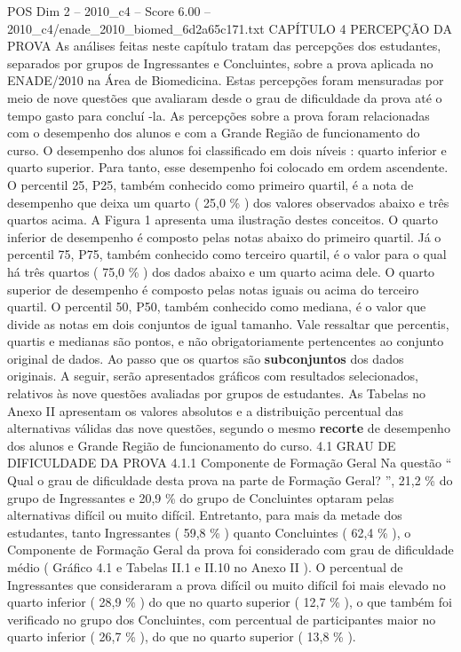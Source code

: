 \begin{textsample}{POS Dim 2 – 2010\_c4 – Score 6.00 – 2010\_c4/enade\_2010\_biomed\_6d2a65c171.txt}  \label{ex:f2_pos_141}
CAPÍTULO 4 PERCEPÇÃO DA PROVA As análises feitas neste capítulo tratam das percepções dos estudantes, separados por grupos de Ingressantes e Concluintes, sobre a prova aplicada no ENADE/2010 na Área de Biomedicina.
Estas percepções foram mensuradas por meio de nove questões que avaliaram desde o grau de dificuldade da prova até o tempo gasto para concluí -la.
As percepções sobre a prova foram relacionadas com o desempenho dos alunos e com a Grande Região de funcionamento do curso.
O desempenho dos alunos foi classificado em dois níveis : quarto inferior e quarto superior.
Para tanto, esse desempenho foi colocado em ordem ascendente.
O percentil 25, P25, também conhecido como primeiro quartil, é a nota de desempenho que deixa um quarto ( 25,0 \% ) dos valores observados abaixo e três quartos acima.
A Figura 1 apresenta uma ilustração destes conceitos.
O quarto inferior de desempenho é composto pelas notas abaixo do primeiro quartil.
Já o percentil 75, P75, também conhecido como terceiro quartil, é o valor para o qual há três quartos ( 75,0 \% ) dos dados abaixo e um quarto acima dele.
O quarto superior de desempenho é composto pelas notas iguais ou acima do terceiro quartil.
O percentil 50, P50, também conhecido como mediana, é o valor que divide as notas em dois conjuntos de igual tamanho.
Vale ressaltar que percentis, quartis e medianas são pontos, e não obrigatoriamente pertencentes ao conjunto original de dados.
Ao passo que os quartos são \textbf{subconjuntos} dos dados originais.
A seguir, serão apresentados gráficos com resultados selecionados, relativos às nove questões avaliadas por grupos de estudantes.
As Tabelas no Anexo II apresentam os valores absolutos e a distribuição percentual das alternativas válidas das nove questões, segundo o mesmo \textbf{recorte} de desempenho dos alunos e Grande Região de funcionamento do curso. 4.1 GRAU DE DIFICULDADE DA PROVA 4.1.1 Componente de Formação Geral Na questão “ Qual o grau de dificuldade desta prova na parte de Formação Geral? ”, 21,2 \% do grupo de Ingressantes e 20,9 \% do grupo de Concluintes optaram pelas alternativas difícil ou muito difícil.
Entretanto, para mais da metade dos estudantes, tanto Ingressantes ( 59,8 \% ) quanto Concluintes ( 62,4 \% ), o Componente de Formação Geral da prova foi considerado com grau de dificuldade médio ( Gráfico 4.1 e Tabelas II.1 e II.10 no Anexo II ).
O percentual de Ingressantes que consideraram a prova difícil ou muito difícil foi mais elevado no quarto inferior ( 28,9 \% ) do que no quarto superior ( 12,7 \% ), o que também foi verificado no grupo dos Concluintes, com percentual de participantes maior no quarto inferior ( 26,7 \% ), do que no quarto superior ( 13,8 \% ).

\end{textsample}
